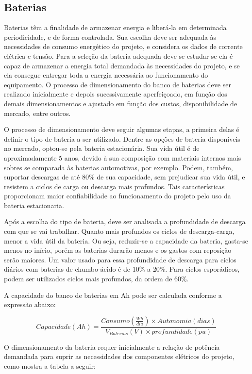 \subsection{Baterias}
	Baterias têm a finalidade de armazenar energia e liberá-la em determinada periodicidade, e de forma controlada. Sua escolha deve ser adequada às necessidades de consumo energético do projeto, e considera os dados de corrente elétrica e tensão. Para a seleção da bateria adequada deve-se estudar se ela é capaz de armazenar a energia total demandada às necessidades do projeto, e se ela consegue entregar toda a energia necessária ao funcionamento do equipamento. O processo de dimensionamento do banco de baterias deve ser realizado inicialmente e depois sucessivamente aperfeiçoado, em função dos demais dimensionamentos e ajustado em função dos custos, disponibilidade de mercado, entre outros.

	O processo de dimensionamento deve seguir algumas etapas, a primeira delas é definir o tipo de bateria a ser utilizado. Dentre as opções de bateria disponíveis no mercado, optou-se pela bateria estacionária. Sua vida útil é de aproximadamente 5 anos, devido à sua composição com materiais internos mais sobres se comparada às baterias automotivas, por exemplo. Podem, também, suportar descargas de até 80\% de sua capacidade, sem prejudicar sua vida útil, e resistem a ciclos de carga ou descarga mais profundos. Tais características proporcionam maior confiabilidade ao funcionamento do projeto pelo uso da bateria estacionaria.
	
	Após a escolha do tipo de bateria, deve ser analisada a profundidade de descarga com que se vai trabalhar. Quanto mais profundos os ciclos de descarga-carga, menor a vida útil da bateria. Ou seja, reduzir-se a capacidade da bateria, gasta-se menos no início, porém as baterias durarão menos e os gastos com reposição serão maiores. Um valor usado para essa profundidade de descarga para ciclos diários com baterias de chumbo-ácido é de 10\% a 20\%. Para ciclos esporádicos, podem ser utilizados ciclos mais profundos, da ordem de 60\%. 
	
	A capacidade do banco de baterias em Ah pode ser calculada conforme a expressão abaixo: 
	
	\begin{equation}
	Capacidade(Ah) = \frac{Consumo(\frac{Wh}{dia}) \times Autonomia(dias)}{V_{Baterias}(V)\times profundidade(pu)}
	\end{equation}

O dimensionamento da bateria requer inicialmente a relação de potência demandada para suprir as necessidades dos componentes elétricos do projeto, como mostra a tabela a seguir:


